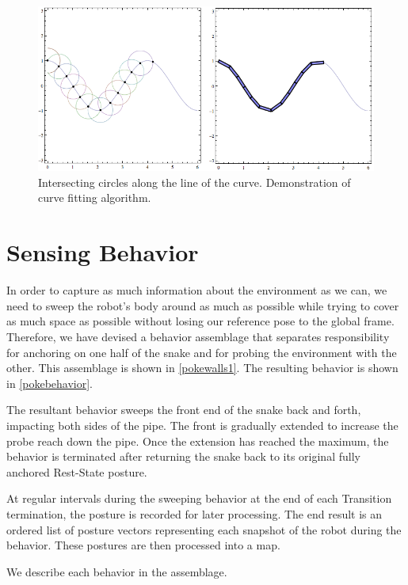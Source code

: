 \begin{figure}[htbp]
\centering
\includegraphics[keepaspectratio,width=400pt,height=0.75\textheight]{2011_01_28_FitAlgorithm_Segs.png}
\caption{Intersecting circles along the line of the curve. Demonstration of curve fitting algorithm.}
\label{plot_3}
\end{figure}



\section{Sensing Behavior}
\label{sensingbehavior}

In order to capture as much information about the environment as we can, we need to sweep the robot's body around as much as possible while trying to cover as much space as possible without losing our reference pose to the global frame. Therefore, we have devised a behavior assemblage that separates responsibility for anchoring on one half of the snake and for probing the environment with the other. This assemblage is shown in \autoref{pokewalls1}. The resulting behavior is shown in \autoref{pokebehavior}.

The resultant behavior sweeps the front end of the snake back and forth, impacting both sides of the pipe. The front is gradually extended to increase the probe reach down the pipe. Once the extension has reached the maximum, the behavior is terminated after returning the snake back to its original fully anchored Rest-State posture.

At regular intervals during the sweeping behavior at the end of each Transition termination, the posture is recorded for later processing. The end result is an ordered list of posture vectors representing each snapshot of the robot during the behavior. These postures are then processed into a map.

We describe each behavior in the assemblage.

